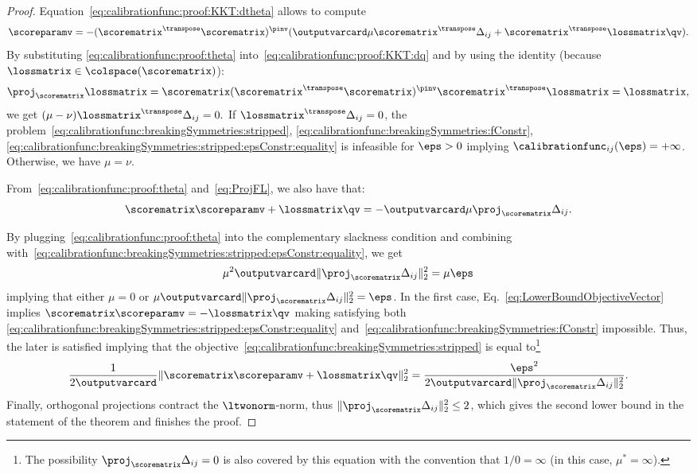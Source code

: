 \documentclass{article}
\begin{document}
\begin{proof}
    Equation~\eqref{eq:calibrationfunc:proof:KKT:dtheta} allows to compute
    \begin{equation}
    \label{eq:calibrationfunc:proof:theta}
    \scoreparamv = -(\scorematrix^\transpose \scorematrix)^\pinv(\outputvarcard \mu \scorematrix^\transpose \Delta_{ij} + \scorematrix^\transpose \lossmatrix \qv).
    \end{equation}
    By substituting \eqref{eq:calibrationfunc:proof:theta} into~\eqref{eq:calibrationfunc:proof:KKT:dq} and by using the identity (because $\lossmatrix \in \colspace(\scorematrix)$):
    \begin{equation}
    \label{eq:ProjFL}
    \proj_{\scorematrix} \lossmatrix = \scorematrix (\scorematrix^\transpose \scorematrix)^\pinv \scorematrix^\transpose \lossmatrix = \lossmatrix,
    \end{equation}
    we get
    $
    (\mu -\nu) \lossmatrix^\transpose \Delta_{ij} = 0.
    $
    If $\lossmatrix^\transpose \Delta_{ij} = 0$, the problem~\eqref{eq:calibrationfunc:breakingSymmetries:stripped}, \eqref{eq:calibrationfunc:breakingSymmetries:fConstr}, \eqref{eq:calibrationfunc:breakingSymmetries:stripped:epsConstr:equality} is infeasible for $\eps > 0$ implying $\calibrationfunc_{ij}(\eps) = +\infty$. Otherwise, we have $\mu = \nu$.
    
    From~\eqref{eq:calibrationfunc:proof:theta} and~\eqref{eq:ProjFL}, we also have that:
    \begin{equation}
    \label{eq:LowerBoundObjectiveVector}
    \scorematrix \scoreparamv + \lossmatrix \qv = -\outputvarcard \mu \proj_\scorematrix \Delta_{ij} .
    \end{equation}
    
    By plugging~\eqref{eq:calibrationfunc:proof:theta} into the complementary slackness condition and combining with~\eqref{eq:calibrationfunc:breakingSymmetries:stripped:epsConstr:equality}, we get
    \[
    \mu^2 \outputvarcard \| \proj_\scorematrix \Delta_{ij} \|_2^2 = \mu \eps
    \]
    implying that either $\mu = 0$ or $\mu \outputvarcard \| \proj_\scorematrix \Delta_{ij} \|_2^2 = \eps$.
    In the first case, Eq.~\eqref{eq:LowerBoundObjectiveVector} implies $\scorematrix \scoreparamv = -\lossmatrix \qv$ making satisfying both \eqref{eq:calibrationfunc:breakingSymmetries:stripped:epsConstr:equality} and~\eqref{eq:calibrationfunc:breakingSymmetries:fConstr} impossible. Thus, the later is satisfied implying that the objective~\eqref{eq:calibrationfunc:breakingSymmetries:stripped} is equal to\footnote{The possibility $\proj_\scorematrix \Delta_{ij}=0$ is also covered by this equation with the convention that $1/0=\infty$ (in this case, $\mu^*=\infty$).}
    \[
    \frac{1}{2 \outputvarcard}\|\scorematrix \scoreparamv + \lossmatrix \qv\|_2^2
    =
    \frac{\eps^2}{2 \outputvarcard \| \proj_\scorematrix \Delta_{ij} \|_2^2}.
    \]
    Finally, orthogonal projections contract the $\ltwonorm$-norm, thus $\|\proj_\scorematrix \Delta_{ij}\|_2^2 \leq 2$, which gives the second lower bound in the statement of the theorem and finishes the proof.
\end{proof}
 
\end{document}

